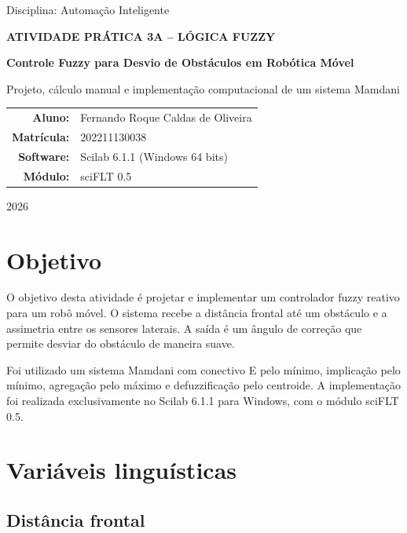 \documentclass[12pt,a4paper]{article}
\begin{document}
\hypersetup{pageanchor=false}
\begin{titlepage}
  \centering
  {\large Disciplina: Automação Inteligente\par}
  \vspace{2.2cm}
  {\Large\bfseries ATIVIDADE PRÁTICA 3A -- LÓGICA FUZZY\par}
  \vspace{0.6cm}
  {\LARGE\bfseries Controle Fuzzy para Desvio de Obstáculos em Robótica Móvel\par}
  \vspace{1.2cm}
  {\large Projeto, cálculo manual e implementação computacional de um sistema Mamdani\par}
  \vfill
  \begin{tabular}{rl}
    \textbf{Aluno:} & Fernando Roque Caldas de Oliveira \\
    \textbf{Matrícula:} & 202211130038 \\
    \textbf{Software:} & Scilab 6.1.1 (Windows 64 bits) \\
    \textbf{Módulo:} & sciFLT 0.5
  \end{tabular}
  \vfill
  {\large 2026\par}
\end{titlepage}

\hypersetup{pageanchor=true}
\tableofcontents
\newpage
{}

\section{Objetivo}

O objetivo desta atividade é projetar e implementar um controlador fuzzy reativo para um robô móvel. O sistema recebe a distância frontal até um obstáculo e a assimetria entre os sensores laterais. A saída é um ângulo de correção que permite desviar do obstáculo de maneira suave.

Foi utilizado um sistema Mamdani com conectivo E pelo mínimo, implicação pelo mínimo, agregação pelo máximo e defuzzificação pelo centroide. A implementação foi realizada exclusivamente no Scilab 6.1.1 para Windows, com o módulo sciFLT 0.5.

\section{Variáveis linguísticas}

\subsection{Distância frontal}
\end{document}
